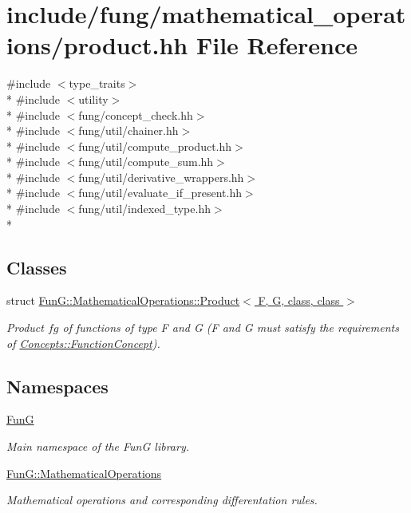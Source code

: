 \hypertarget{product_8hh}{}\section{include/fung/mathematical\+\_\+operations/product.hh File Reference}
\label{product_8hh}
{\ttfamily \#include $<$type\+\_\+traits$>$}\\*
{\ttfamily \#include $<$utility$>$}\\*
{\ttfamily \#include $<$fung/concept\+\_\+check.\+hh$>$}\\*
{\ttfamily \#include $<$fung/util/chainer.\+hh$>$}\\*
{\ttfamily \#include $<$fung/util/compute\+\_\+product.\+hh$>$}\\*
{\ttfamily \#include $<$fung/util/compute\+\_\+sum.\+hh$>$}\\*
{\ttfamily \#include $<$fung/util/derivative\+\_\+wrappers.\+hh$>$}\\*
{\ttfamily \#include $<$fung/util/evaluate\+\_\+if\+\_\+present.\+hh$>$}\\*
{\ttfamily \#include $<$fung/util/indexed\+\_\+type.\+hh$>$}\\*
\subsection*{Classes}
\begin{DoxyCompactItemize}
\item 
struct \hyperlink{structFunG_1_1MathematicalOperations_1_1Product}{Fun\+G\+::\+Mathematical\+Operations\+::\+Product$<$ F, G, class, class $>$}
\begin{DoxyCompactList}\small\item\em Product $fg$ of functions of type F and G (F and G must satisfy the requirements of \hyperlink{structFunG_1_1Concepts_1_1FunctionConcept}{Concepts\+::\+Function\+Concept}). \end{DoxyCompactList}\end{DoxyCompactItemize}
\subsection*{Namespaces}
\begin{DoxyCompactItemize}
\item 
 \hyperlink{namespaceFunG}{FunG}
\begin{DoxyCompactList}\small\item\em Main namespace of the FunG library. \end{DoxyCompactList}\item 
 \hyperlink{namespaceFunG_1_1MathematicalOperations}{Fun\+G\+::\+Mathematical\+Operations}
\begin{DoxyCompactList}\small\item\em Mathematical operations and corresponding differentation rules. \end{DoxyCompactList}\end{DoxyCompactItemize}
